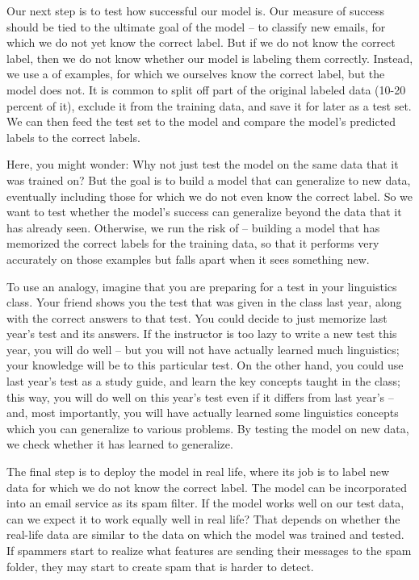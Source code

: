 Our next step is to test how successful our model is.  Our measure of success should be tied to the ultimate goal of the model -- to classify new emails, for which we do not yet know the correct label.  But if we do not know the correct label, then we do not know whether our model is labeling them correctly.  Instead, we use a  of  examples, for which we ourselves know the correct label, but the model does not.  It is common to split off part of the original labeled data (10-20 percent of it), exclude it from the training data, and save it for later as a test set.  We can then feed the test set to the model and compare the model's predicted labels to the correct labels.


Here, you might wonder: Why not just test the model on the same data that it was trained on?  But the goal is to build a model that can generalize to new data, eventually including those for which we do not even know the correct label.  So we want to test whether the model's success can generalize beyond the data that it has already seen.  Otherwise, we run the risk of  -- building a model that has memorized  the correct labels for the training data, so that it performs very accurately on those examples but falls apart when it sees something new.  

To use an analogy, imagine that you are preparing for a test in your linguistics class.  Your friend shows you the test that was given in the class last year, along with the correct answers to that test.  You could decide to just memorize last year's test and its answers.  If the instructor is too lazy to write a new test this year, you will do well -- but you will not have actually learned much linguistics; your knowledge will be  to this particular test.  On the other hand, you could use last year's test as a study guide, and learn the key concepts taught in the class; this way, you will do well on this year's test even if it differs from last year's -- and, most importantly, you will have actually learned some linguistics concepts which you can generalize to various problems.  By testing the model on new data, we check whether it has learned to generalize.

The final step is to deploy the model in real life, where its job is to label new data for which we do not know the correct label.  The model can be incorporated into an email service as its spam filter.   If the model works well on our test data, can we expect it to work equally well in real life?  That depends on whether the real-life data are similar to the data on which the model was trained and tested.  If spammers start to realize what features are sending their messages to the spam folder, they may start to create spam that is harder to detect.


